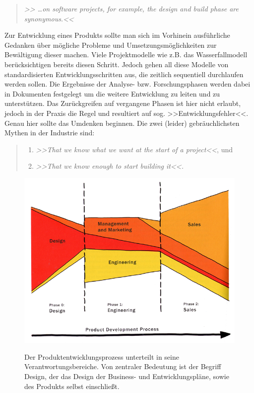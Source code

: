 \begin{quote}
	\emph{>> \ldots on software projects, for example, the design and build phase are synonymous.<<}
	\begin{flushright}\citep{Nokes:2003}\end{flushright}
\end{quote}

\medskip Zur Entwicklung eines Produkts sollte man sich im Vorhinein ausführliche Gedanken über mögliche Probleme und Umsetzungsmöglichkeiten zur Bewältigung dieser machen. Viele Projektmodelle wie z.B. das Wasserfallmodell berücksichtigen bereits diesen Schritt. Jedoch gehen all diese Modelle von standardisierten Entwicklungsschritten aus, die zeitlich sequentiell durchlaufen werden sollen. Die Ergebnisse der Analyse- bzw. Forschungsphasen werden dabei in Dokumenten festgelegt um die weitere Entwicklung zu leiten und zu unterstützen. Das Zurückgreifen auf vergangene Phasen ist hier nicht erlaubt, jedoch in der Praxis die Regel und resultiert auf sog. >>Entwicklungsfehler<<.
Genau hier sollte das Umdenken beginnen. Die zwei (leider) gebräuchlichsten Mythen in der Industrie sind: 
\begin{quote}
	\begin{enumerate}
		\item \textsl{>>That we know what we want at the start of a project<<}, und
		\item \textsl{>>That we know enough to start building it<<.}
	\end{enumerate}
	\begin{flushright}\citep{Buxton:2007}\end{flushright}
\end{quote}

\begin{figure}
        {\includegraphics[width=\linewidth]{gfx/buxtonProductDevProcess}}
		\caption[Der Produktentwicklungsprozess \newline \citep{Buxton:2007}]{Der Produktentwicklungsprozess unterteilt in seine Verantwortungsbereiche. Von zentraler Bedeutung ist der Begriff Design, der das Design der Business- und Entwicklungspläne, sowie des Produkts selbst einschließt.}\label{fig:buxtonProductDevProcess}
\end{figure}

